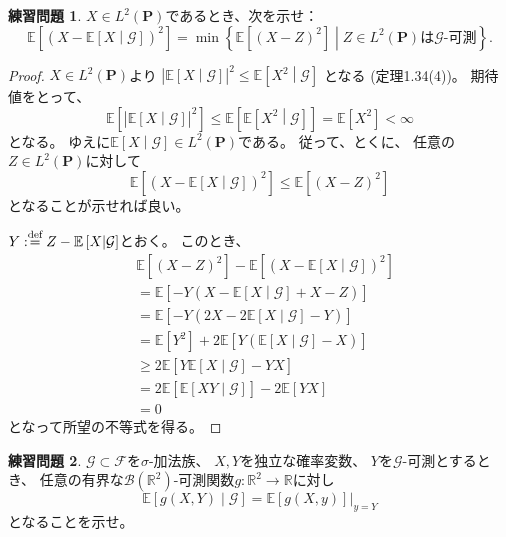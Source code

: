 \documentclass[uplatex]{jsarticle}
\theoremstyle{definition}
\newtheorem{prob}[prob]{練習問題}
\def\R{\mathbb{R}}
\def\P{\mathbf{P}}
\def\E{\mathbb{E}}
\def\mcB{\mathcal{B}}
\def\mcF{\mathcal{F}}
\def\mcG{\mathcal{G}}
\def\dfn{:\overset{\mbox{{\scriptsize def}}}{=}}
\begin{document}
\begin{prob}\label{prob: 1.6}
  \(X\in L^2(\P)\)であるとき、次を示せ：
  \[
  \E\left[\left(X-\E\left[X\middle|\mcG\right]\right)^2\right]
  = \min \left\{ \E\left[(X-Z)^2\right] \middle|
  \text{\(Z\in L^2(\P)\)は\(\mcG\)-可測}\right\}.
  \]
\end{prob}

\begin{proof}
  \(X\in L^2(\P)\)より
  \(
  \left| \E\left[ X\middle| \mcG\right]\right|^2
  \leq \E \left[ X^2 \middle| \mcG\right]
  \)
  となる (定理1.34(4))。
  期待値をとって、
  \[
  \E\left[ \left| \E\left[ X\middle| \mcG\right]\right|^2 \right]
  \leq \E \left[ \E \left[ X^2 \middle| \mcG\right]\right]
  = \E [X^2] < \infty
  \]
  となる。
  ゆえに\(\E\left[X\middle|\mcG\right]\in L^2(\P)\)である。
  従って、とくに、
  任意の\(Z\in L^2(\P)\)に対して
  \[
  \E\left[ \left(X-\E\left[X\middle|\mcG\right]\right)^2\right]
  \leq \E\left[ (X-Z)^2\right]
  \]
  となることが示せれば良い。

  \(Y \dfn Z-\E\left[X\middle|\mcG\right]\)とおく。
  このとき、
  \begin{align*}
    &\E\left[ (X-Z)^2\right]
    - \E\left[ \left(X-\E\left[X\middle|\mcG\right]\right)^2\right] \\
    &= \E\left[ -Y\left(X-\E\left[X\middle|\mcG\right]+X-Z\right)\right] \\
    &= \E\left[ -Y\left(2X-2\E\left[X\middle|\mcG\right]-Y\right)\right] \\
    &= \E[Y^2] + 2\E\left[ Y\left(\E\left[X\middle|\mcG\right]-X\right)\right] \\
    &\geq 2\E\left[ Y\E\left[X\middle|\mcG\right]-YX\right] \\
    &= 2\E\left[ \E\left[XY\middle|\mcG\right]\right] - 2\E\left[YX\right] \\
    &= 0
  \end{align*}
  となって所望の不等式を得る。
\end{proof}













\begin{prob}\label{prob: 1.7}
  \(\mcG\subset \mcF\)を\(\sigma\)-加法族、
  \(X,Y\)を独立な確率変数、
  \(Y\)を\(\mcG\)-可測とするとき、
  任意の有界な\(\mcB(\R^2)\)-可測関数\(g:\R^2\to \R\)に対し
  \[
  \E\left[ g(X,Y)\middle| \mcG\right]
  = \E\left[ g(X,y) \right]|_{y=Y}
  \]
  となることを示せ。
\end{prob}
\end{document}
